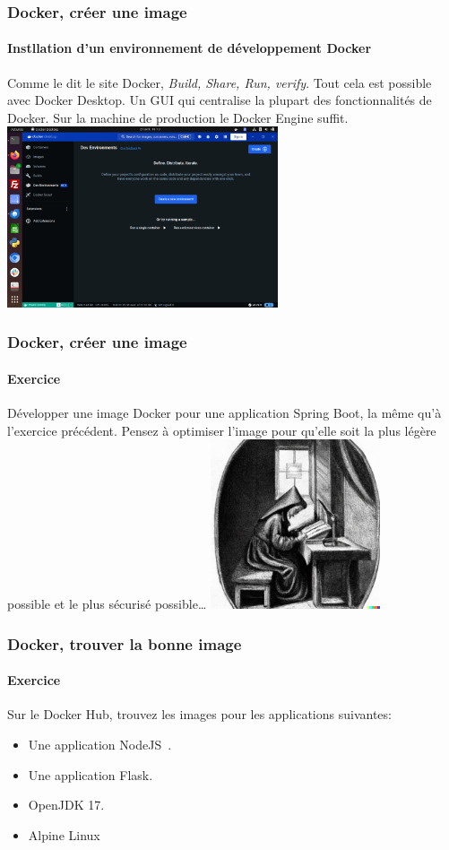 \documentclass{beamer}
\begin{document}
    \begin{frame}
        \transdissolve
        \frametitle{Docker, créer une image}
        \framesubtitle{Instllation d'un environnement de développement Docker}
        Comme le dit le site Docker, \textit{Build, Share, Run, verify}.
        Tout cela est possible avec Docker Desktop.
        Un GUI qui centralise la plupart des fonctionnalités de Docker.
        \bigbreak
        Sur la machine de production le Docker Engine suffit.
        \bigbreak
        \centering
        \includegraphics[width=8cm]{image/docker-desktop.png}
    \end{frame}

    \begin{frame}
        \transdissolve
        \frametitle{Docker, créer une image}
        \framesubtitle{Exercice}
        Développer une image Docker pour une application Spring Boot, la même qu'à l'exercice précédent.
        \bigbreak
        Pensez à optimiser l'image pour qu'elle soit la plus légère possible et le plus sécurisé possible\ldots
        \bigbreak
        \centering
        \includegraphics[width=5cm]{image/young-studying.png}
    \end{frame}

    \begin{frame}
        \transdissolve
        \frametitle{Docker, trouver la bonne image}
        \framesubtitle{Exercice}
        Sur le Docker Hub, trouvez les images pour les applications suivantes:
        \begin{itemize}
            \item Une application NodeJS~.
            \item Une application Flask.
            \item OpenJDK 17.
            \item Alpine Linux
        \end{itemize}
    \end{frame}
\end{document}
